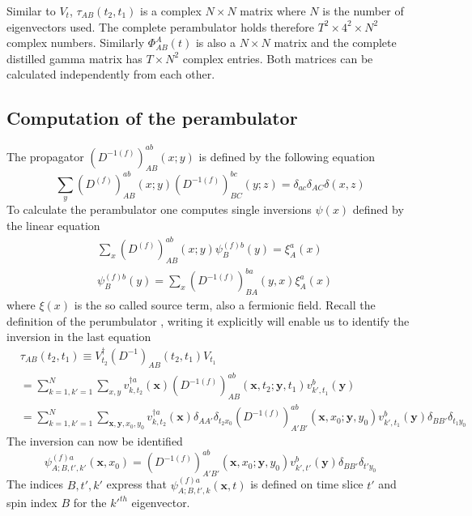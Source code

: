     Similar to $V_t$, $\tau_{AB}(t_2,t_1)$ is a complex $N \times N$ matrix where $N$ is the number of eigenvectors used. The complete perambulator holds therefore $T^2 \times 4^2 \times N^2$ complex numbers. Similarly $\Phi_{AB}^A(t)$ is also a $N \times N$ matrix and the complete distilled gamma matrix has $T \times N^2$ complex entries. Both matrices can be calculated independently from each other.
    
\subsection{Computation of the perambulator}
    The propagator $(D^{-1(f)})^{ab}_{AB}(x;y)$ is defined by the following equation \cite{four_quark_correlation_functions}
    \begin{equation}
        \sum_{y}(D^{(f)})^{ab}_{AB}(x;y)(D^{-1(f)})^{bc}_{BC}(y;z) = \delta_{ac}\delta_{AC}\delta(x,z)
    \end{equation}
    To calculate the perambulator one computes single inversions $\psi(x)$ defined by the linear equation
    \begin{equation}
        \begin{aligned}\label{inversion_term}
            &\sum_{x}(D^{(f)})^{ab}_{AB}(x;y)\psi^{(f)b}_{B}(y) = \xi^a_A(x)\\
            &\psi^{(f)b}_{B}(y) = \sum_{x}(D^{-1(f)})^{ba}_{BA}(y,x)\xi^a_A(x)
        \end{aligned}
    \end{equation}
    where $\xi(x)$ is the so called source term, also a fermionic field. Recall the definition of the perumbulator , writing it explicitly will enable us to identify the inversion in the last equation \cite{bachelor_thesis_jan}
    \begin{equation}\label{perambulator_explicit}
        \begin{aligned}
            &\tau_{AB}(t_2,t_1) \equiv V^\dagger_{t_2}(D^{-1})_{AB}(t_2,t_1)V_{t_1}\\
            &= \sum_{k=1,k'=1}^N \sum_{x,y}
            v_{k,t_2}^{\dagger a}(\textbf{x}) 
            (D^{-1(f)})^{ab}_{AB}(\textbf{x},t_2;\textbf{y},t_1)
            v_{k',t_1}^{b}(\textbf{y})\\
            &= \sum_{k=1,k'=1}^N \sum_{\textbf{x},\textbf{y},x_0,y_0}
            v_{k,t_2}^{\dagger a}(\textbf{x})\delta_{AA'}\delta_{t_2 x_0}
            (D^{-1(f)})^{ab}_{A'B'}(\textbf{x},x_0;\textbf{y},y_0)
            v_{k',t_1}^{b}(\textbf{y})\delta_{BB'}\delta_{t_1 y_0}
        \end{aligned}
    \end{equation}
    The inversion  can now be identified
    \begin{equation}
        \psi^{(f)a}_{A;B,t',k'}(\textbf{x},x_0) = (D^{-1(f)})^{ab}_{A'B'}(\textbf{x},x_0;\textbf{y},y_0)
            v_{k',t'}^{b}(\textbf{y})\delta_{BB'}\delta_{t'y_0}
    \end{equation}
    The indices $B,t',k'$ express that $\psi^{(f)a}_{A;B,t',k}(\textbf{x},t)$ is defined on time slice $t'$ and spin index $B$ for the $k'^{th}$ eigenvector.\\
    
